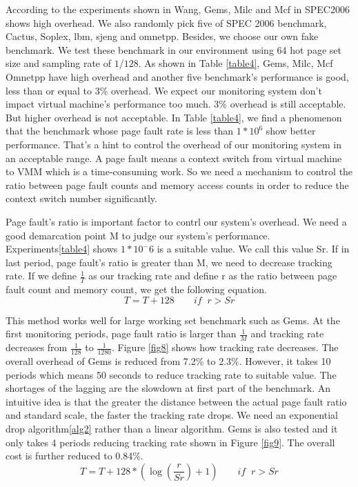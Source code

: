 \documentclass[10pt,twocolumn]{article}
\begin{document}
According to the experiments shown in Wang\cite{Wang2016Dynamic}, Gems, Milc and Mcf in SPEC2006 shows high overhead. We also randomly pick five of SPEC 2006 benchmark, Cactus, Soplex, lbm, sjeng and omnetpp. Besides, we choose our own fake benchmark. We test these benchmark in our environment using 64 hot page set size and sampling rate of $1/128$. As shown in Table \ref{table4}, Gems, Milc, Mcf Omnetpp have high overhead and another five benchmark's performance is good, less than or equal to 3\% overhead. We expect our monitoring system don't impact virtual machine's performance too much. 3\% overhead is still acceptable. But higher overhead is not acceptable. In Table \ref{table4}, we find a phenomenon that the benchmark whose page fault rate is less than $1*10^6$ show better performance. That's a hint to control the overhead of our monitoring system in an acceptable range. A page fault means a context switch from virtual machine to VMM which is a time-consuming work. So we need a mechanism to control the ratio between page fault counts and memory access counts in order to reduce the context switch number significantly.

Page fault's ratio is important factor to contrl our system's overhead. We need a good demarcation point M to judge our system's performance. Experiments\ref{table4} shows $1*10^-6$ is a suitable value. We call this value Sr. If in last period, page fault's ratio is greater than M, we need to decrease tracking rate. If we define $\frac{1}{T}$ as our tracking rate and define r as the ratio between page fault count and memory count, we get the following equation.
\begin{equation}
T = T + 128 \qquad if\;\; r>Sr
\end{equation}

This method works well for large working set benchmark such as Gems. At the first monitoring periods, page fault ratio is larger than $\frac{1}{M}$ and tracking rate decreases from $\frac{1}{128}$ to $\frac{1}{1280}$. Figure \ref{fig8} shows how tracking rate decreases. The overall overhead of Gems is reduced from 7.2\% to 2.3\%. However, it takes 10 periods which means 50 seconds to reduce tracking rate to suitable value. The shortages of the lagging are the slowdown at first part of the benchmark. An intuitive idea is that the greater the distance between the actual page fault ratio and standard scale, the faster the tracking rate drops. We need an exponential drop algorithm\ref{alg2} rather than a linear algorithm. Gems is also tested and it only takes 4 periods reducing tracking rate shown in Figure \ref{fig9}. The overall cost is further reduced to 0.84\%.
\begin{equation}
T = T + 128 * (\log(\frac{r}{Sr}) + 1) \qquad if\;\; r>Sr
\end{equation}
\label{alg2}
\end{document}
